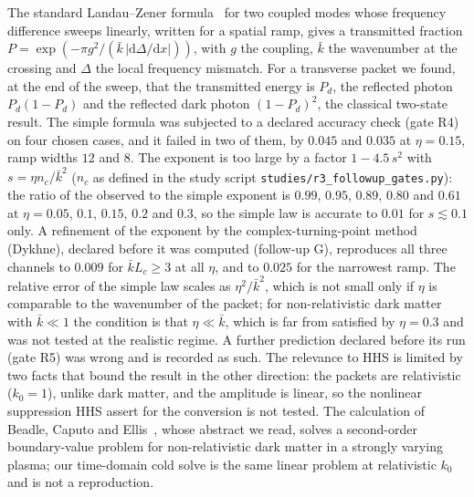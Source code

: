 The standard Landau--Zener formula~\cite{Landau1932,Zener1932} for two coupled modes whose frequency difference sweeps linearly, written for a spatial ramp, gives a transmitted fraction $P=\exp(-\pi g^2/(\bar k\,|\mathrm d\Delta/\mathrm dx|))$, with $g$ the coupling, $\bar k$ the wavenumber at the crossing and $\Delta$ the local frequency mismatch. For a transverse packet we found, at the end of the sweep, that the transmitted energy is $P_d$, the reflected photon $P_d(1-P_d)$ and the reflected dark photon $(1-P_d)^2$, the classical two-state result. The simple formula was subjected to a declared accuracy check (gate R4) on four chosen cases, and it failed in two of them, by $0.045$ and $0.035$ at $\eta=0.15$, ramp widths $12$ and $8$. The exponent is too large by a factor $1-4.5\,s^2$ with $s=\eta n_c/\bar k^2$ ($n_c$ as defined in the study script \texttt{studies/r3\_followup\_gates.py}): the ratio of the observed to the simple exponent is $0.99$, $0.95$, $0.89$, $0.80$ and $0.61$ at $\eta=0.05$, $0.1$, $0.15$, $0.2$ and $0.3$, so the simple law is accurate to $0.01$ for $s\lesssim0.1$ only. A refinement of the exponent by the complex-turning-point method (Dykhne), declared before it was computed (follow-up G), reproduces all three channels to $0.009$ for $\bar kL_c\ge3$ at all $\eta$, and to $0.025$ for the narrowest ramp. The relative error of the simple law scales as $\eta^2/\bar k^2$, which is not small only if $\eta$ is comparable to the wavenumber of the packet; for non-relativistic dark matter with $\bar k\ll1$ the condition is that $\eta\ll\bar k$, which is far from satisfied by $\eta=0.3$ and was not tested at the realistic regime. A further prediction declared before its run (gate R5) was wrong and is recorded as such. The relevance to HHS is limited by two facts that bound the result in the other direction: the packets are relativistic ($k_0=1$), unlike dark matter, and the amplitude is linear, so the nonlinear suppression HHS assert for the conversion is not tested. The calculation of Beadle, Caputo and Ellis~\cite{BeadleCaputoEllis2024}, whose abstract we read, solves a second-order boundary-value problem for non-relativistic dark matter in a strongly varying plasma; our time-domain cold solve is the same linear problem at relativistic $k_0$ and is not a reproduction.


